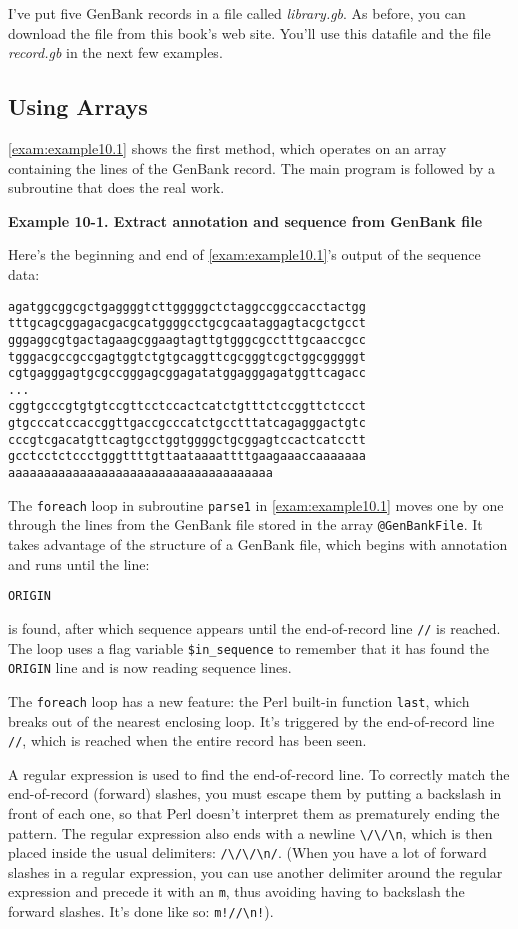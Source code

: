 I've put five GenBank records in a file called \textit{library.gb}. As before, you can download the file from this book's web site. You'll use this datafile and the file \textit{record.gb} in the next few examples.

\subsection{Using Arrays}
\autoref{exam:example10.1} shows the first method, which operates on an array containing the lines of the GenBank record. The main program is followed by a subroutine that does the real work.

\textbf{Example 10-1. Extract annotation and sequence from GenBank file}


Here's the beginning and end of \autoref{exam:example10.1}'s output of the sequence data:

\begin{lstlisting}
agatggcggcgctgaggggtcttgggggctctaggccggccacctactgg
tttgcagcggagacgacgcatggggcctgcgcaataggagtacgctgcct
gggaggcgtgactagaagcggaagtagttgtgggcgcctttgcaaccgcc
tgggacgccgccgagtggtctgtgcaggttcgcgggtcgctggcgggggt
cgtgagggagtgcgccgggagcggagatatggagggagatggttcagacc
...
cggtgcccgtgtgtccgttcctccactcatctgtttctccggttctccct
gtgcccatccaccggttgaccgcccatctgcctttatcagagggactgtc
cccgtcgacatgttcagtgcctggtggggctgcggagtccactcatcctt
gcctcctctccctgggttttgttaataaaattttgaagaaaccaaaaaaa
aaaaaaaaaaaaaaaaaaaaaaaaaaaaaaaaaaaaa
\end{lstlisting}

The \verb|foreach| loop in subroutine \verb|parse1| in \autoref{exam:example10.1} moves one by one through the lines from the GenBank file stored in the array \verb|@GenBankFile|. It takes advantage of the structure of a GenBank file, which begins with annotation and runs until the line:

\verb|ORIGIN|

is found, after which sequence appears until the end-of-record line \verb|//| is reached. The loop uses a flag variable \verb|$in_sequence| to remember that it has found the \verb|ORIGIN| line and is now reading sequence lines.

The \verb|foreach| loop has a new feature: the Perl built-in function \verb|last|, which breaks out of the nearest enclosing loop. It's triggered by the end-of-record line \verb|//|, which is reached when the entire record has been seen.

A regular expression is used to find the end-of-record line. To correctly match the end-of-record (forward) slashes, you must escape them by putting a backslash in front of each one, so that Perl doesn't interpret them as prematurely ending the pattern. The regular expression also ends with a newline \verb|\/\/\n|, which is then placed inside the usual delimiters: \verb|/\/\/\n/|. (When you have a lot of forward slashes in a regular expression, you can use another delimiter around the regular expression and precede it with an \verb|m|, thus avoiding having to backslash the forward slashes. It's done like so: \verb|m!//\n!|).

